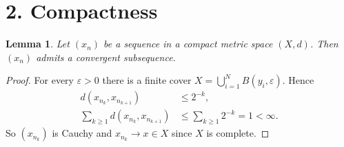 \documentclass[12pt]{article}\usepackage{amsmath,amssymb,amsthm}\pagestyle{empty}
\newtheorem{lemma}{Lemma}
\begin{document}
\section*{2. Compactness}
\begin{lemma} Let $(x_n)$ be a sequence in a compact metric space $(X,d)$. Then $(x_n)$ admits a convergent subsequence. \end{lemma}
\begin{proof} For every $\varepsilon>0$ there is a finite cover $X=\bigcup_{i=1}^{N} B(y_i,\varepsilon)$. Hence
\begin{align*}
d(x_{n_k},x_{n_{k+1}}) &\le 2^{-k}, \\
\sum_{k\ge 1} d(x_{n_k},x_{n_{k+1}}) &\le \sum_{k\ge1} 2^{-k} = 1 < \infty .
\end{align*}
So $(x_{n_k})$ is Cauchy and $x_{n_k}\to x\in X$ since $X$ is complete. \end{proof}
\end{document}
